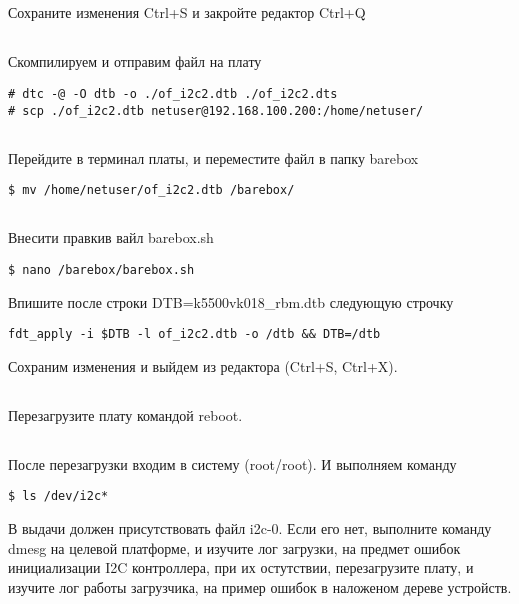 \subsection{}Сохраните изменения Ctrl+S и закройте редактор Ctrl+Q 

\subsection{}Скомпилируем и отправим файл на плату
\begin{lstlisting}[style=bash]
# dtc -@ -O dtb -o ./of_i2c2.dtb ./of_i2c2.dts
# scp ./of_i2c2.dtb netuser@192.168.100.200:/home/netuser/
\end{lstlisting}

\subsection{}Перейдите в терминал платы, и переместите файл в папку barebox
\begin{lstlisting}[style=bash]
$ mv /home/netuser/of_i2c2.dtb /barebox/
\end{lstlisting}

\subsection{}Внесити правкив вайл barebox.sh
\begin{lstlisting}[style=bash]
$ nano /barebox/barebox.sh
\end{lstlisting}
Впишите после строки DTB=k5500vk018\_rbm.dtb следующую строчку
\begin{lstlisting}[style=stdout]
fdt_apply -i $DTB -l of_i2c2.dtb -o /dtb && DTB=/dtb
\end{lstlisting}
Сохраним изменения и выйдем из редактора (Ctrl+S, Ctrl+X).

\subsection{}Перезагрузите плату командой reboot.

\subsection{}После перезагрузки входим в систему (root/root). И выполняем команду
\begin{lstlisting}[style=bash]
$ ls /dev/i2c*
\end{lstlisting} 

В выдачи должен присутствовать файл i2c-0. Если его нет, выполните команду dmesg на целевой платформе, и изучите лог загрузки, на предмет ошибок инициализации I2C контроллера, при их остутствии, перезагрузите плату, и изучите лог работы загрузчика, на пример ошибок в наложеном дереве устройств.

